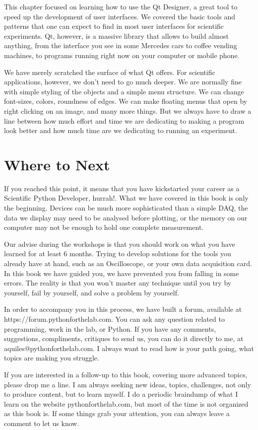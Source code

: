 This chapter focused on learning how to use the Qt Designer, a great tool to speed up the development of user interfaces. We covered the basic tools and patterns that one can expect to find in most user interfaces for scientific experiments. Qt, however, is a massive library that allows to build almost anything, from the interface you see in some Mercedes cars to coffee vending machines, to programs running right now on your computer or mobile phone.

We have merely scratched the surface of what Qt offers. For scientific applications, however, we don't need to go much deeper. We are normally fine with simple styling of the objects and a simple menu structure. We can change font-sizes, colors, roundness of edges. We can make floating menus that open by right clicking on an image, and many more things. But we always have to draw a line between how much effort and time we are dedicating to making a program look better and how much time are we dedicating to running an experiment.

\section{Where to Next}\label{sec:where-to-next}
If you reached this point, it means that you have kickstarted your career as a Scientific Python Developer, hurrah!. What we have covered in this book is only the beginning. Devices can be much more sophisticated than a simple DAQ, the data we display may need to be analysed before plotting, or the memory on our computer may not be enough to hold one complete measurement.

Our advise during the workshops is that you should work on what you have learned for at least 6 months. Trying to develop solutions for the tools you already have at hand, such as an Oscilloscope, or your own data acquisition card. In this book we have guided you, we have prevented you from falling in some errors. The reality is that you won't master any technique until you try by yourself, fail by yourself, and solve a problem by yourself.

In order to accompany you in this process, we have built a forum, available at https://forum.pythonforthelab.com. You can ask any question related to programming, work in the lab, or Python. If you have any comments, suggestions, compliments, critiques to send us, you can do it directly to me, at aquiles@pythonforthelab.com. I always want to read how is your path going, what topics are making you struggle.

If you are interested in a follow-up to this book, covering more advanced topics, please drop me a line. I am always seeking new ideas, topics, challenges, not only to produce content, but to learn myself. I do a periodic braindump of what I learn on the website pythonforthelab.com, but most of the time is not organized as this book is. If some things grab your attention, you can always leave a comment to let us know.
